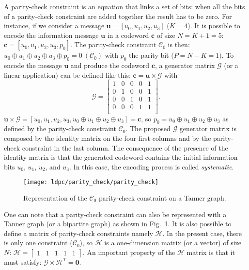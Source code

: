 A parity-check constraint is an equation that links a set of bits: when all the
bits of a parity-check constraint are added together the result has to be
zero. For instance, if we consider a message $\bm{u} = [u_0, u_1, u_2, u_3]$
($K = 4$). It is possible to encode the information message $\bm{u}$ in a
codeword $\bm{c}$ of size $N = K + 1 = 5$: $\bm{c} = [u_0,u_1,u_2,u_3,p_0]$.
The parity-check constraint $\mathcal{C}_0$ is then: $u_0 \oplus u_1 \oplus u_2
\oplus u_3 \oplus p_0 = 0~(\mathcal{C}_0)$ with $p_0$ the parity bit ($P = N -
K = 1)$. To encode the message $\bm{u}$ and produce the codeword $\bm{c}$, a
generator matrix $\bm{\mathcal{G}}$ (or a linear application) can be defined
like this: $\bm{c} = \bm{u} \times \bm{\mathcal{G}}$ with
\begin{equation*}
\bm{\mathcal{G}} =
\begin{bmatrix}
1 & 0 & 0 & 0 & 1\\
0 & 1 & 0 & 0 & 1\\
0 & 0 & 1 & 0 & 1\\
0 & 0 & 0 & 1 & 1\\
\end{bmatrix}
.
\end{equation*}
$\bm{u} \times \bm{\mathcal{G}} = [u_0,u_1,u_2,u_3,u_0 \oplus u_1 \oplus u_2
\oplus u_3] = \bm{c}$, so $p_0 = u_0 \oplus u_1 \oplus u_2 \oplus u_3$ as
defined by the parity-check constraint $\mathcal{C}_0$. The proposed
$\bm{\mathcal{G}}$ generator matrix is composed by the identity matrix on the
four first columns and by the parity-check constraint in the last column.
The consequence of the presence of the identity matrix is that the generated
codeword contains the initial information bits $u_0$, $u_1$, $u_2$, and $u_3$.
In this case, the encoding process is called \emph{systematic}.

\begin{figure}[htp]
  \centering
  \texttt{[image: ldpc/parity\_check/parity\_check]}
  \caption{Representation of the $\mathcal{C}_0$ parity-check constraint on a
    Tanner graph.}
  \label{fig:alg_ldpc_parity_check}
\end{figure}

One can note that a parity-check constraint can also be represented with a
Tanner graph (or a bipartite graph) as shown in
Fig.~\ref{fig:alg_ldpc_parity_check}. It is also possible to define a matrix of
parity-check constraints namely $\bm{\mathcal{H}}$. In the present case, there
is only one constraint ($\mathcal{C}_0$), so $\bm{\mathcal{H}}$ is a
one-dimension matrix (or a vector) of size $N$:
$
\bm{\mathcal{H}} =
\begin{bmatrix}
1 & 1 & 1 & 1 & 1
\end{bmatrix}.
$
An important property of the $\bm{\mathcal{H}}$ matrix is that it must satisfy:
$\bm{\mathcal{G}} \times \bm{\mathcal{H}}^T = \bm{0}.$

